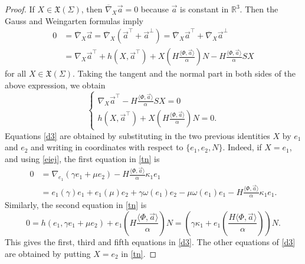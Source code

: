 \documentclass{birkjour}
\theoremstyle{definition}
\theoremstyle{remark}
\numberwithin{equation}{section}
\def\r{\mathbb R}
\begin{document}
\begin{proof} 
 If $X\in\mathfrak{X}(\Sigma)$, then   $\overline{\nabla}_X\vec{a}=0$ because $\vec{a}$ is constant in $\r^3$. Then the Gauss and
Weingarten formulas imply 
\begin{equation*}
\begin{split}
    0&=\overline{\nabla}_{X}\vec{a}=\overline{\nabla}_{X}(\vec{a}^{\top}+\vec{a}^{\perp})=\overline{\nabla}_X\vec{a}^\top+\overline{\nabla}_X\vec{a}^\perp\\
    &={\nabla}_{X}\vec{a}^{\top}+h(X,\vec{a}^{\top})+X( H\frac{\langle\Phi,\vec{a}\rangle}{\alpha})N- H\frac{\langle \Phi,\vec{a}\rangle}{\alpha} SX 
\end{split}
\end{equation*}
for all   $X\in\mathfrak{X}(\Sigma)$.
Taking the tangent and the normal part in both sides of the above expression, we obtain  
\begin{equation}\label{tn} 
    \left\{
    \begin{array}{ll}
        {\nabla}_{X}\vec{a}^{\top}-H\frac{\langle\Phi,\vec{a}\rangle}{\alpha}SX=0\\
        h(X, \vec{a}^{\top})+X(H\frac{\langle\Phi,\vec{a}\rangle}{\alpha})N=0.
    \end{array}
    \right.
\end{equation}
Equations \eqref{d3} are obtained by substituting  in the two previous identities $X$ by $e_1$ and   $e_2$  and writing in coordinates with respect to $\{e_1,e_2,N\}$. Indeed, if $X=e_1$, and using \eqref{eiej}, the first equation in \eqref{tn} is 
\begin{equation*} 
    \begin{array}{ll}
  0&=  {\nabla}_{e_1}(\gamma e_1+\mu e_2)-H\frac{\langle \Phi,\vec{a}\rangle}{\alpha}\kappa_1 e_1\\
     & =e_1(\gamma)e_1+e_1(\mu)e_2+\gamma \omega(e_1)e_2-\mu\omega(e_1)e_1-H\frac{\langle \Phi,\vec{a}\rangle}{\alpha}\kappa_1 e_1.
         \end{array}
\end{equation*}
Similarly, the second equation in \eqref{tn} is 
$$   0 = h(e_1,\gamma e_1+\mu e_2)+e_1(H\frac{\langle\Phi,\vec{a}\rangle}{\alpha})N =\left(\gamma\kappa_1+e_1\left(\frac{ H\langle\Phi,\vec{a}\rangle}{\alpha}\right)\right)N.$$
This gives the first, third and fifth equations in \eqref{d3}. The other equations of \eqref{d3} are obtained by putting $X=e_2$ in \eqref{tn}.

\end{proof}
\end{document}
